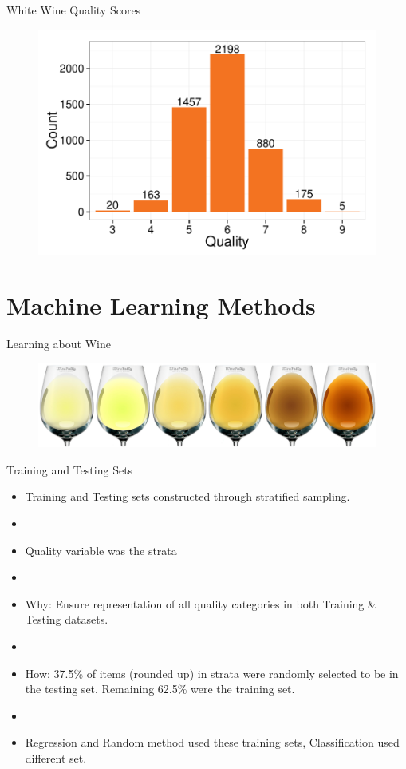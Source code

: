 \documentclass{beamer}
\begin{document}
\begin{frame}{White Wine Quality Scores}
\begin{figure}
	\centering
	\includegraphics[width=\textwidth]{../images/white_hist.pdf}
\end{figure}
\end{frame}

\section{Machine Learning Methods}

\begin{frame}{Learning about Wine}
	\begin{figure}
		\centering
		\includegraphics[width=\textwidth]{../images/gradient.jpg}
	\end{figure}
\end{frame}

\begin{frame}{Training and Testing Sets}
	\begin{itemize}
	\item Training and Testing sets constructed through stratified sampling.
	\item[]
	\item Quality variable was the strata
	\item[]
	\item Why: Ensure representation of all quality categories in both Training \& Testing datasets.
	\item[]
	\item How: 37.5\% of items (rounded up) in strata were randomly selected to be in the testing set. Remaining 62.5\% were the training set.
	\item[]
	\item Regression and Random method used these training sets, Classification used different set.	
	\end{itemize}
\end{frame}
\end{document}
